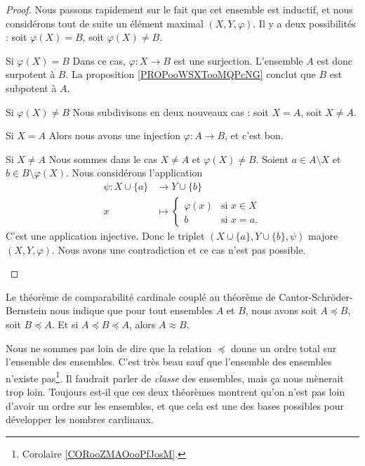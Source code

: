 \begin{proof}
    Nous passons rapidement sur le fait que cet ensemble est inductif, et nous considérons tout de suite un élément maximal \( (X,Y,\varphi)\). Il y a deux possibilités : soit \( \varphi(X)=B\), soit \( \varphi(X)\neq B\).
    \begin{subproof}
        \item[Si \( \varphi(X)=B\)]
            Dans ce cas, \( \varphi\colon X\to B\) est une surjection. L'ensemble \( A\) est donc surpotent à \( B\). La proposition \ref{PROPooWSXTooMQPcNG} conclut que \( B\) est subpotent à \( A\).
        \item[Si \( \varphi(X)\neq B\)]
            Nous subdivisons en deux nouveaux cas : soit \( X=A\), soit \( X\neq A\).
            \begin{subproof}
                \item[Si \( X=A\)]
                    Alors nous avons une injection \( \varphi\colon A\to B\), et c'est bon.
                \item[Si \( X\neq A\)]
                    Nous sommes dans le cas \( X\neq A\) et \( \varphi(X)\neq B\). Soient \( a\in A\setminus X\) et \( b\in B\setminus \varphi(X)\). Nous considérons l'application
                    \begin{equation}
                        \begin{aligned}
                            \psi\colon X\cup\{ a \}&\to Y\cup\{ b \} \\
                            x&\mapsto \begin{cases}
                                \varphi(x)    &   \text{si } x\in X\\
                                b    &    \text{si }x=a.
                            \end{cases}
                        \end{aligned}
                    \end{equation}
                    C'est une application injective. Donc le triplet \( (X\cup \{ a \}, Y\cup\{ b \},\psi)\) majore \( (X,Y,\varphi)\). Nous avons une contradiction et ce cas n'est pas possible.
            \end{subproof}
    \end{subproof}
\end{proof}

\begin{normaltext}
    Le théorème de comparabilité cardinale couplé au théorème de Cantor-Schröder-Bernstein nous indique que pour tout ensembles \( A\) et \( B\), nous avons soit \( A\preceq B\), soit \( B\preceq A\). Et si \( A\preceq B\preceq A\), alors \( A\approx B\).

    Nous ne sommes pas loin de dire que la relation \( \preceq\) donne un ordre total sur l'ensemble des ensembles. C'est très beau sauf que l'ensemble des ensembles n'existe pas\footnote{Corolaire \ref{CORooZMAOooPfJosM}.}. Il faudrait parler de \emph{classe} des ensembles, mais ça nous mènerait trop loin. Toujours est-il que ces deux théorèmes montrent qu'on n'est pas loin d'avoir un ordre sur les ensembles, et que cela est une des bases possibles pour développer les nombres cardinaux.
\end{normaltext}


